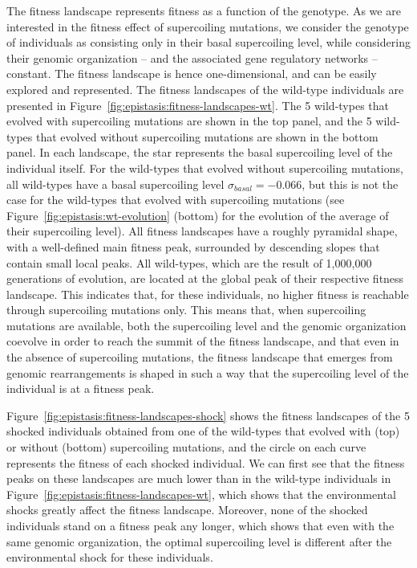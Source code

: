 The fitness landscape represents fitness as a function of the genotype.
As we are interested in the fitness effect of supercoiling mutations, we consider the genotype of individuals as consisting only in their basal supercoiling level, while considering their genomic organization -- and the associated gene regulatory networks -- constant.
The fitness landscape is hence one-dimensional, and can be easily explored and represented.
The fitness landscapes of the wild-type individuals are presented in Figure~\ref{fig:epistasis:fitness-landscapes-wt}.
The 5 wild-types that evolved with supercoiling mutations are shown in the top panel, and the 5 wild-types that evolved without supercoiling mutations are shown in the bottom panel.
In each landscape, the star represents the basal supercoiling level of the individual itself.
For the wild-types that evolved without supercoiling mutations, all wild-types have a basal supercoiling level $\sigma_{basal} = -0.066$, but this is not the case for the wild-types that evolved with supercoiling mutations (see Figure~\ref{fig:epistasis:wt-evolution} (bottom) for the evolution of the average of their supercoiling level).
All fitness landscapes have a roughly pyramidal shape, with a well-defined main fitness peak, surrounded by descending slopes that contain small local peaks.
All wild-types, which are the result of 1,000,000 generations of evolution, are located at the global peak of their respective fitness landscape.
This indicates that, for these individuals, no higher fitness is reachable through supercoiling mutations only.
This means that, when supercoiling mutations are available, both the supercoiling level and the genomic organization coevolve in order to reach the summit of the fitness landscape, and that even in the absence of supercoiling mutations, the fitness landscape that emerges from genomic rearrangements is shaped in such a way that the supercoiling level of the individual is at a fitness peak.

Figure~\ref{fig:epistasis:fitness-landscapes-shock} shows the fitness landscapes of the 5 shocked individuals obtained from one of the wild-types that evolved with (top) or without (bottom) supercoiling mutations, and the circle on each curve represents the fitness of each shocked individual.
We can first see that the fitness peaks on these landscapes are much lower than in the wild-type individuals in Figure~\ref{fig:epistasis:fitness-landscapes-wt}, which shows that the environmental shocks greatly affect the fitness landscape.
Moreover, none of the shocked individuals stand on a fitness peak any longer, which shows that even with the same genomic organization, the optimal supercoiling level is different after the environmental shock for these individuals.

